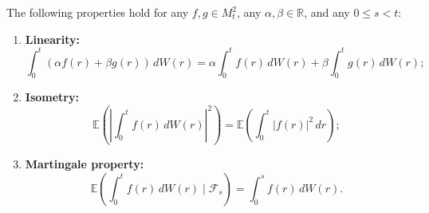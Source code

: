 \begin{Theorem}
\label{th:7.3}
The following properties hold for any $f, g \in M_t^2$, any $\alpha, \beta \in \mathbb{R}$, and any $0 \leq s < t$:

\begin{enumerate}
\item \textbf{Linearity:}
\begin{equation}
\int_0^t (\alpha f(r) + \beta g(r)) \, dW(r) = \alpha \int_0^t f(r) \, dW(r) + \beta \int_0^t g(r) \, dW(r);
\end{equation}

\item \textbf{Isometry:}
\begin{equation}
\mathbb{E}\left(\left|\int_0^t f(r) \, dW(r)\right|^2\right) = \mathbb{E}\left(\int_0^t |f(r)|^2 \, dr\right);
\end{equation}

\item \textbf{Martingale property:}
\begin{equation}
\mathbb{E}\left(\int_0^t f(r) \, dW(r) \mid \mathcal{F}_s\right) = \int_0^s f(r) \, dW(r).
\end{equation}
\end{enumerate}
\end{Theorem}

